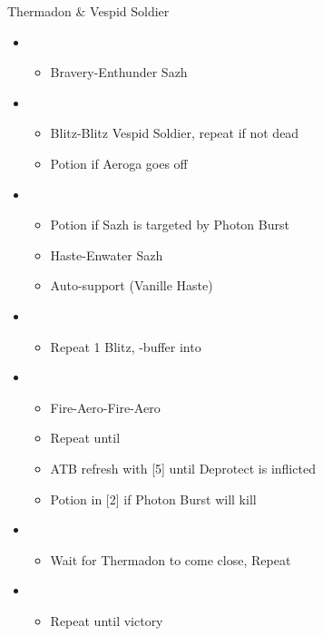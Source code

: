 	\begin{battle}[1:15]{Thermadon \& Vespid Soldier}
		\begin{itemize}
			\item \first
			      \begin{itemize}
				      \item Bravery-Enthunder Sazh
			      \end{itemize}
			\item \sixth
			      \begin{itemize}
				      \item Blitz-Blitz Vespid Soldier, repeat if not dead
				      \item Potion if Aeroga goes off
			      \end{itemize}
			\item \first
			      \begin{itemize}
				      \item Potion if Sazh is targeted by Photon Burst
				      \item Haste-Enwater Sazh
				      \item Auto-support (Vanille Haste)
			      \end{itemize}
			\item \sixth
			      \begin{itemize}
				      \item Repeat 1 Blitz, \rav-buffer into
			      \end{itemize}
			\item \fourth
			      \begin{itemize}
				      \item Fire-Aero-Fire-Aero
				      \item Repeat until \stagger
				      \item ATB refresh with [5] until Deprotect is inflicted
				      \item Potion in [2] if Photon Burst will kill
			      \end{itemize}
			\item \second
			      \begin{itemize}
				      \item Wait for Thermadon to come close, Repeat
			      \end{itemize}
			\item \third
			      \begin{itemize}
				      \item Repeat until victory
			      \end{itemize}
		\end{itemize}
	\end{battle}
	
